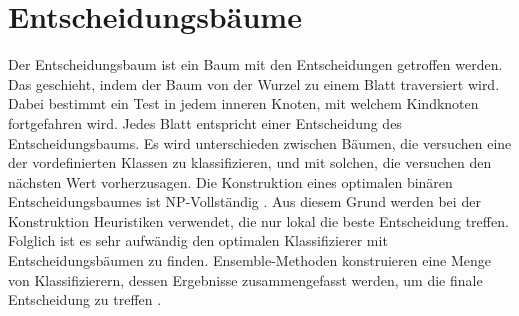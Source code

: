 \chapter{Entscheidungsbäume}
Der Entscheidungsbaum ist ein Baum mit den Entscheidungen getroffen werden. Das geschieht, indem der Baum von der Wurzel zu einem Blatt traversiert wird. Dabei bestimmt ein Test in jedem inneren Knoten,
mit welchem Kindknoten fortgefahren wird. Jedes Blatt entspricht einer Entscheidung des Entscheidungsbaums. Es wird unterschieden zwischen Bäumen, die versuchen eine der vordefinierten Klassen zu klassifizieren,
und mit solchen, die versuchen den nächsten Wert vorherzusagen.
\newline
\newline
Die Konstruktion eines optimalen binären Entscheidungsbaumes ist NP-Vollständig \cite{laurent1976constructing}. Aus diesem Grund werden bei der Konstruktion
Heuristiken verwendet, die nur lokal die beste Entscheidung treffen. Folglich ist es sehr aufwändig den optimalen Klassifizierer mit Entscheidungsbäumen zu finden. Ensemble-Methoden konstruieren eine Menge von
Klassifizierern, dessen Ergebnisse zusammengefasst werden, um die finale Entscheidung zu treffen \cite{dietterich2002ensemble}.



